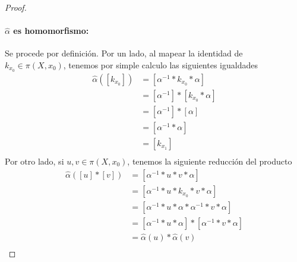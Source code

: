 {\begin{proof}
  \paragraph{\(\hat \alpha\) es homomorfismo:} Se procede por
  definición. Por un lado, al mapear la identidad de \(k_{x_0} \in \pi
  (X, x_0) \), tenemos por simple calculo las siguientes igualdades
  \begin{align*}
    \hat \alpha ([k_{x_0}])
                 &= [\alpha^{-1} * k_{x_0} * \alpha] \\
                 &= [\alpha^{-1}] * [k_{x_0} * \alpha] \\
                 &= [\alpha^{-1}] * [\alpha] \\
                 &= [\alpha^{-1} * \alpha] \\
                 &= [k_{x_1}] \\
  \end{align*}
  Por otro lado, si \(u,v \in \pi (X, x_0) \), tenemos la siguiente
  reducción del producto
  \begin{align*}
    \hat \alpha ([u] * [v]) &= [\alpha^{-1} * u * v * \alpha] \\
    &= [\alpha^{-1} * u * k_{x_0} * v * \alpha] \\
    &= [\alpha^{-1} * u * \alpha * \alpha^{-1} * v * \alpha] \\
    &= [\alpha^{-1} * u * \alpha ] * [ \alpha^{-1} * v * \alpha] \\
    &= \hat \alpha (u) * \hat \alpha (v) \\
  \end{align*}


\end{proof}}

